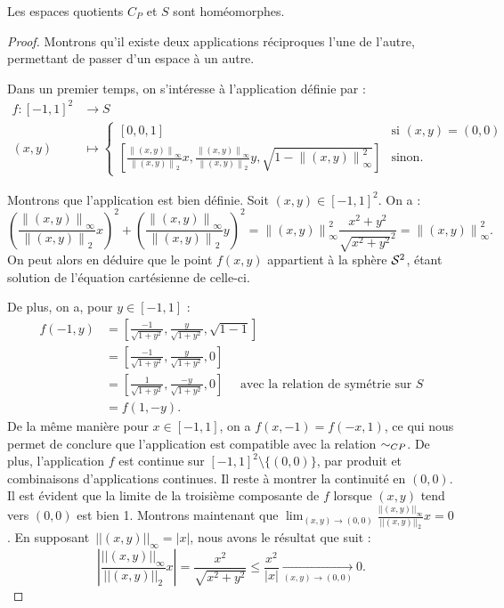 \documentclass[hidelinks, 10pt]{article}
\begin{document}
\begin{proposition}\label{homeo-S-CP}
Les espaces quotients $C_P$ et $S$ sont homéomorphes.
\end{proposition}
\begin{proof}
Montrons qu'il existe deux applications réciproques l'une de l'autre, permettant de passer d'un espace à un autre.

Dans un premier temps, on s'intéresse à l'application définie par : \[\begin{split}
    f:[-1,1]^2&\longrightarrow S\\
    (x,y)&\mapsto\left\{\begin{matrix}
    [0,0,1]&\text{si } (x,y)=(0,0)\\
\left[\frac{\left \|(x,y)  \right \|_\infty}{\left \| (x,y) \right \|_2}x,\frac{\left \|(x,y)  \right \|_\infty}{\left \| (x,y) \right \|_2}y,\sqrt{1-\left \|(x,y)  \right \|_\infty^2}\right]&\text{sinon.}
\end{matrix}\right.
\end{split}\]

Montrons que l'application est bien définie. Soit $(x,y)\in[-1,1]^2$. On a : \[\left(\frac{\left \|(x,y)  \right \|_\infty}{\left \| (x,y) \right \|_2}x\right)^2+\left(\frac{\left \|(x,y)  \right \|_\infty}{\left \| (x,y) \right \|_2}y\right)^2=\left \| (x,y) \right \|_\infty^2\frac{x^2+y^2}{\sqrt{x^2+y^2}^2}=\left \| (x,y) \right \|_\infty^2.\]On peut alors en déduire que le point $f(x,y)$ appartient à la sphère $\mathcal{S}^{2}$, étant solution de l'équation cartésienne de celle-ci.

De plus, on a, pour $y\in[-1,1]$ :\[\begin{split}
f(-1,y)&=\left[\frac{-1}{\sqrt{1+y^2}},\frac{y}{\sqrt{1+y^2}},\sqrt{1-1}\right]\\
&=\left[\frac{-1}{\sqrt{1+y^2}},\frac{y}{\sqrt{1+y^2}},0\right]\\
&=\left[\frac{1}{\sqrt{1+y^2}},\frac{-y}{\sqrt{1+y^2}},0\right]\quad\text{ avec la relation de symétrie sur }S\\
&=f(1,-y).
\end{split}\]De la même manière pour $x\in[-1,1]$, on a $f(x,-1)=f(-x,1)$, ce qui nous permet de conclure que l'application est compatible avec la relation $\sim_{CP}$. De plus, l'application $f$ est continue sur $[-1,1]^2\setminus\{(0,0)\}$, par produit et combinaisons d'applications continues. Il reste à montrer la continuité en $(0,0)$. Il est évident que la limite de la troisième composante de $f$ lorsque $(x,y)$ tend vers $(0,0)$ est bien 1. Montrons maintenant que $\lim_{(x,y)\rightarrow(0,0)}\frac{||(x,y)||_\infty}{||(x,y)||_2}x=0$. En supposant~$||(x,y)||_\infty=|x|$, nous avons le résultat que suit : \[\left|\frac{||(x,y)||_\infty}{||(x,y)||_2}x\right|=\frac{x^2}{\sqrt{x^2+y^2}}\leq\frac{x^2}{|x|}\underset{(x,y)\rightarrow(0,0)}{\longrightarrow}0.\]


\end{proof}
\end{document}
